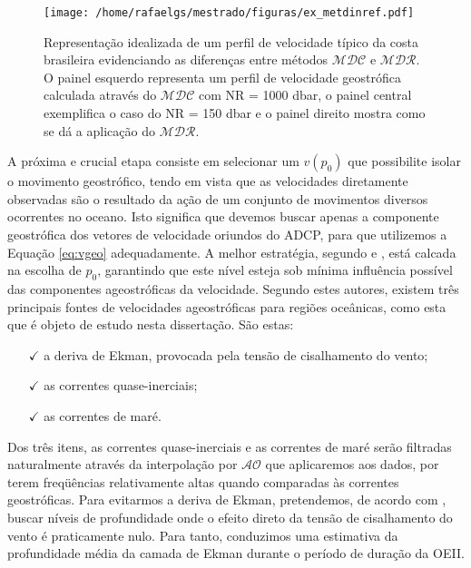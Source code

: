 \begin{figure}%
 \begin{center}
  \texttt{[image: /home/rafaelgs/mestrado/figuras/ex\_metdinref.pdf]}
 \end{center}
 \vspace{-.25cm}
 \renewcommand{\baselinestretch}{1}
 \caption{\label{fig:ex_metdinref} \small Representação idealizada de um perfil de velocidade típico da 
costa brasileira evidenciando as diferenças entre métodos $\mathcal{MDC}$ e $\mathcal{MDR}$. O painel esquerdo
representa um perfil de velocidade geostrófica calculada através do $\mathcal{MDC}$ com NR = 1000 dbar, o painel central
exemplifica o caso do NR = 150 dbar e o painel direito mostra como se dá a aplicação do $\mathcal{MDR}$.}
\end{figure}

A próxima e crucial etapa consiste em selecionar um $v(p_0)$ que possibilite isolar o movimento geostrófico, tendo em vista
que as velocidades diretamente observadas são o resultado da ação de um conjunto de movimentos
diversos ocorrentes no oceano. Isto significa que devemos buscar apenas a 
componente geostrófica dos vetores de velocidade oriundos do ADCP, para que utilizemos a Equação \ref{eq:vgeo}
adequadamente. A melhor estratégia, segundo \cite{sutton_chereskin2002} e \cite{pickard_lindstrom1993},
está calcada na escolha de $p_0$, garantindo que este nível esteja
sob mínima influência possível das componentes ageostróficas da velocidade.
Segundo estes autores, existem três principais fontes de 
velocidades ageostróficas para regiões oceânicas, como esta que é objeto de estudo nesta dissertação.
São estas: 

\begin{itemize}

\item[$\checkmark$] a deriva de Ekman, provocada pela tensão de cisalhamento do vento;

\item[$\checkmark$] as correntes quase-inerciais;

\item[$\checkmark$] as correntes de maré.   

\end{itemize}

Dos três itens, as correntes quase-inerciais e as correntes de maré serão filtradas naturalmente através 
da interpolação por $\mathcal{AO}$ que aplicaremos aos dados, por terem freq\"uências relativamente altas quando comparadas às
correntes geostróficas. Para evitarmos a deriva de Ekman, pretendemos, de acordo com \cite{sutton_chereskin2002},
buscar níveis de profundidade onde o efeito direto da tensão de cisalhamento do vento é praticamente nulo.
Para tanto, conduzimos uma estimativa da profundidade média da camada de Ekman durante o período de duração da 
OEII. 

